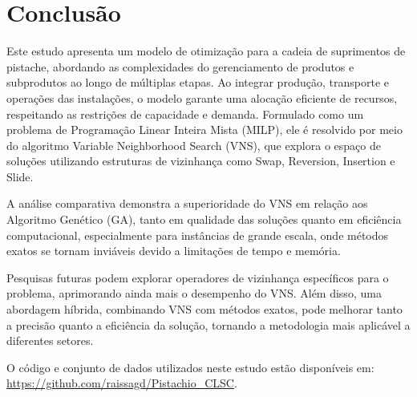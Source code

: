 \documentclass[a4paper]{ifacconf}
\begin{document}
\section{Conclusão}
\label{sec:conclusion1}

Este estudo apresenta um modelo de otimização para a cadeia de suprimentos de pistache, abordando as complexidades do gerenciamento de produtos e subprodutos ao longo de múltiplas etapas. 
Ao integrar produção, transporte e operações das instalações, o modelo garante uma alocação eficiente de recursos, respeitando as restrições de capacidade e demanda. Formulado como um problema 
de Programação Linear Inteira Mista (MILP), ele é resolvido por meio do algoritmo Variable Neighborhood Search (VNS), que explora o espaço de soluções utilizando estruturas de vizinhança como 
Swap, Reversion, Insertion e Slide.

A análise comparativa demonstra a superioridade do VNS em relação aos Algoritmo Genético (GA), tanto em qualidade das soluções quanto em eficiência computacional, especialmente para 
instâncias de grande escala, onde métodos exatos se tornam inviáveis devido a limitações de tempo e memória.

Pesquisas futuras podem explorar operadores de vizinhança específicos para o problema, aprimorando ainda mais o desempenho do VNS. Além disso, uma abordagem híbrida, combinando VNS com métodos 
exatos, pode melhorar tanto a precisão quanto a eficiência da solução, tornando a metodologia mais aplicável a diferentes setores.

O código e conjunto de dados utilizados neste estudo estão disponíveis em: \url{https://github.com/raissagd/Pistachio_CLSC}.

\else
% 
\end{document}
